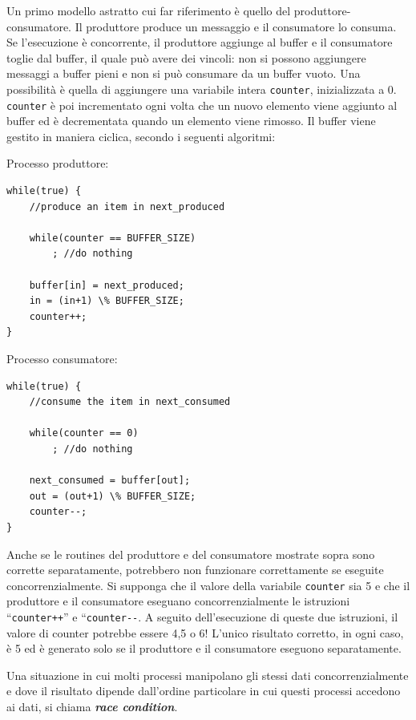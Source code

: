 \documentclass[a4paper]{article}
\begin{document}
Un primo modello astratto cui far riferimento è quello del produttore-consumatore. Il produttore produce un messaggio e il consumatore lo consuma. Se l'esecuzione è concorrente, il produttore aggiunge al buffer e il consumatore toglie dal buffer, il quale può avere dei vincoli: non si possono aggiungere messaggi a buffer pieni e non si può consumare da un buffer vuoto.\newline
Una possibilità è quella di aggiungere una variabile intera \texttt{counter}, inizializzata a 0. \texttt{counter} è poi incrementato ogni volta che un nuovo elemento viene aggiunto al buffer ed è decrementata quando un elemento viene rimosso. \newline
Il buffer viene gestito in maniera ciclica, secondo i seguenti algoritmi:

Processo produttore:
\begin{verbatim}
while(true) {
    //produce an item in next_produced
	
    while(counter == BUFFER_SIZE)
        ; //do nothing
	
    buffer[in] = next_produced;
    in = (in+1) \% BUFFER_SIZE;
    counter++;
}
\end{verbatim}

Processo consumatore:
\begin{verbatim}
while(true) {
    //consume the item in next_consumed
	
    while(counter == 0)
        ; //do nothing
	
    next_consumed = buffer[out];
    out = (out+1) \% BUFFER_SIZE;
    counter--;
}
\end{verbatim}

Anche se le routines del produttore e del consumatore mostrate sopra sono corrette separatamente, potrebbero non funzionare correttamente se eseguite concorrenzialmente. Si supponga che il valore della variabile \texttt{counter} sia 5 e che il produttore e il consumatore eseguano concorrenzialmente le istruzioni ``\texttt{counter++}'' e ``\texttt{counter-{}-}. A seguito dell'esecuzione di queste due istruzioni, il valore di counter potrebbe essere 4,5 o 6! L'unico risultato corretto, in ogni caso, è 5 ed è generato solo se il produttore e il consumatore eseguono separatamente.

Una situazione in cui molti processi manipolano gli stessi dati concorrenzialmente e dove il risultato dipende dall'ordine particolare in cui questi processi accedono ai dati, si chiama \textit{\textbf{race condition}}.
\end{document}
